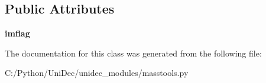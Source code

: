 \subsection*{Public Attributes}
\begin{DoxyCompactItemize}
\item 
\hypertarget{class_uni_dec_1_1unidec__modules_1_1masstools_1_1_test_list_ctrl3_a3298590b9bd59da8e3a33dad6047fb11}{}{\bfseries imflag}\label{class_uni_dec_1_1unidec__modules_1_1masstools_1_1_test_list_ctrl3_a3298590b9bd59da8e3a33dad6047fb11}

\end{DoxyCompactItemize}


The documentation for this class was generated from the following file\+:\begin{DoxyCompactItemize}
\item 
C\+:/\+Python/\+Uni\+Dec/unidec\+\_\+modules/masstools.\+py\end{DoxyCompactItemize}

